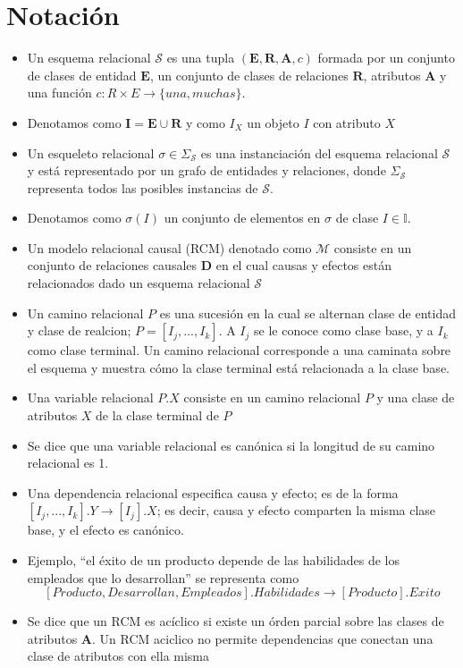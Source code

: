 \documentclass[11pt]{article}
\theoremstyle{plain}
\begin{document}
\section{Notación}
\begin{itemize}
\item Un esquema relacional $\mathcal{S}$ es una tupla $(\mathbf{E},\mathbf{R},\mathbf{A},c)$ formada por un conjunto de  clases de entidad $\mathbf{E}$, un conjunto de clases de relaciones $\mathbf{R}$, atributos $\mathbf{A}$ y una función $c : R \times E \to \{una, muchas \}$.
\item Denotamos como $\mathbf{I} = \mathbf{E} \cup \mathbf{R}$ y como $I_X$ un objeto $I$ con atributo $X$
\item Un esqueleto relacional $\sigma \in \Sigma_{\mathcal{S}}$ es una instanciación del esquema relacional $\mathcal{S}$ y está representado por un grafo de entidades y relaciones, donde $\Sigma_{\mathcal{S}}$ representa todos las posibles instancias de $\mathcal{S}$.
\item Denotamos como $\sigma(I)$ un conjunto de elementos en $\sigma$ de clase $I \in \mathbb{I}$.
\item Un modelo relacional causal (RCM) denotado como $\mathcal{M}$ consiste en un conjunto de relaciones causales $\mathbf{D}$ en el cual causas y efectos están relacionados dado un esquema relacional $\mathcal{S}$
\item Un camino relacional $P$ es una sucesión en la cual se alternan clase de entidad y clase de realcion; $P=[I_j,...,I_k]$. A $I_j$ se le conoce como clase base, y a $I_k$ como clase terminal. Un camino relacional corresponde a una caminata sobre el esquema y muestra cómo la clase terminal está relacionada a la clase base.
\item Una variable relacional $P.X$ consiste en un camino relacional $P$ y una clase de atributos $X$ de la clase terminal de $P$
\item Se dice que una variable relacional es canónica si la longitud de su camino relacional es 1.
\item Una dependencia relacional especifica causa y efecto; es de la forma $[I_j,...,I_k].Y \to [I_j].X$; es decir, causa y efecto comparten la misma clase base, y el efecto es canónico.
\item Ejemplo, “el éxito de un producto depende de las habilidades de los empleados que lo desarrollan” se representa como
\[ [Producto, Desarrollan, Empleados].Habilidades \to [Producto].Exito \]
\item Se dice que un RCM es acíclico si existe un órden parcial sobre las clases de atributos $\mathbf{A}$. Un RCM aciclico no permite dependencias que conectan una clase de atributos con ella misma

\end{itemize}
\end{document}
